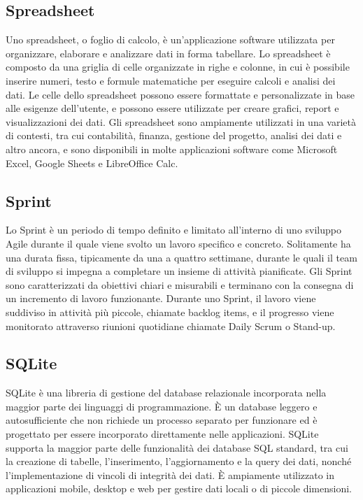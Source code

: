 \vspace{2em}
\subsection*{Spreadsheet}
Uno spreadsheet, o foglio di calcolo, è un'applicazione software utilizzata per organizzare, elaborare e analizzare dati in forma tabellare. Lo spreadsheet è composto da una griglia di celle organizzate in righe e colonne, in cui è possibile inserire numeri, testo e formule matematiche per eseguire calcoli e analisi dei dati. Le celle dello spreadsheet possono essere formattate e personalizzate in base alle esigenze dell'utente, e possono essere utilizzate per creare grafici, report e visualizzazioni dei dati. Gli spreadsheet sono ampiamente utilizzati in una varietà di contesti, tra cui contabilità, finanza, gestione del progetto, analisi dei dati e altro ancora, e sono disponibili in molte applicazioni software come Microsoft Excel, Google Sheets e LibreOffice Calc.

\vspace{2em}
\subsection*{Sprint}
Lo Sprint è un periodo di tempo definito e limitato all'interno di uno sviluppo Agile durante il quale viene svolto un lavoro specifico e concreto. Solitamente ha una durata fissa, tipicamente da una a quattro settimane, durante le quali il team di sviluppo si impegna a completare un insieme di attività pianificate. Gli Sprint sono caratterizzati da obiettivi chiari e misurabili e terminano con la consegna di un incremento di lavoro funzionante. Durante uno Sprint, il lavoro viene suddiviso in attività più piccole, chiamate backlog items, e il progresso viene monitorato attraverso riunioni quotidiane chiamate Daily Scrum o Stand-up.

\vspace{2em}
\subsection*{SQLite}
SQLite è una libreria di gestione del database relazionale incorporata nella maggior parte dei linguaggi di programmazione. È un database leggero e autosufficiente che non richiede un processo separato per funzionare ed è progettato per essere incorporato direttamente nelle applicazioni. SQLite supporta la maggior parte delle funzionalità dei database SQL standard, tra cui la creazione di tabelle, l'inserimento, l'aggiornamento e la query dei dati, nonché l'implementazione di vincoli di integrità dei dati. È ampiamente utilizzato in applicazioni mobile, desktop e web per gestire dati locali o di piccole dimensioni.

